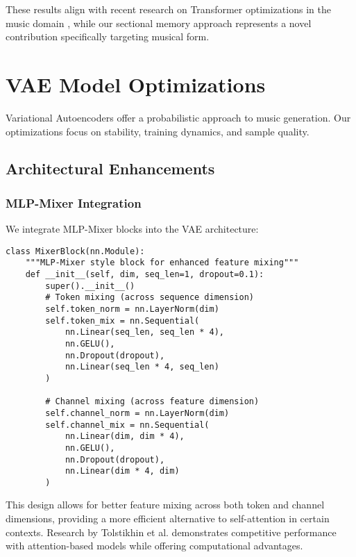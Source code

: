 \documentclass[12pt,a4paper]{article}
\begin{document}
These results align with recent research on Transformer optimizations in the music domain \cite{huang2018music}, while our sectional memory approach represents a novel contribution specifically targeting musical form.

\section{VAE Model Optimizations}

Variational Autoencoders offer a probabilistic approach to music generation. Our optimizations focus on stability, training dynamics, and sample quality.

\subsection{Architectural Enhancements}

\subsubsection{MLP-Mixer Integration}

We integrate MLP-Mixer blocks \cite{tolstikhin2021mlp} into the VAE architecture:

\begin{verbatim}
class MixerBlock(nn.Module):
    """MLP-Mixer style block for enhanced feature mixing"""
    def __init__(self, dim, seq_len=1, dropout=0.1):
        super().__init__()
        # Token mixing (across sequence dimension)
        self.token_norm = nn.LayerNorm(dim)
        self.token_mix = nn.Sequential(
            nn.Linear(seq_len, seq_len * 4),
            nn.GELU(),
            nn.Dropout(dropout),
            nn.Linear(seq_len * 4, seq_len)
        )
        
        # Channel mixing (across feature dimension)
        self.channel_norm = nn.LayerNorm(dim)
        self.channel_mix = nn.Sequential(
            nn.Linear(dim, dim * 4),
            nn.GELU(),
            nn.Dropout(dropout),
            nn.Linear(dim * 4, dim)
        )
\end{verbatim}

This design allows for better feature mixing across both token and channel dimensions, providing a more efficient alternative to self-attention in certain contexts. Research by Tolstikhin et al. \cite{tolstikhin2021mlp} demonstrates competitive performance with attention-based models while offering computational advantages.
\end{document}
